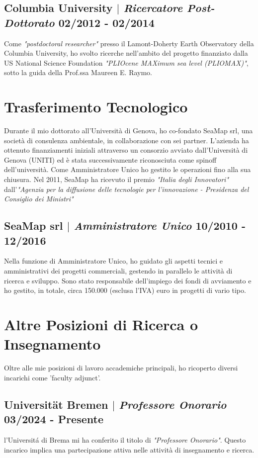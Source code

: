 \documentclass[11pt]{article}
\begin{document}
\subsection{Columbia University $|$ {\normalfont\textit{Ricercatore Post-Dottorato}} \hfill 02/2012 - 02/2014}
{\footnotesize Come \textit{"postdoctoral researcher"} presso il Lamont-Doherty Earth Observatory della Columbia University, ho svolto ricerche nell'ambito del progetto finanziato dalla US National Science Foundation \textit{"PLIOcene MAXimum sea level (PLIOMAX)"}, sotto la guida della Prof.ssa Maureen E. Raymo.}

\section{Trasferimento Tecnologico}
{\normalfont Durante il mio dottorato all'Università di Genova, ho co-fondato SeaMap srl, una società di consulenza ambientale, in collaborazione con sei partner. L'azienda ha ottenuto finanziamenti iniziali attraverso un consorzio avviato dall'Università di Genova (UNITI) ed è stata successivamente riconosciuta come spinoff dell'università. Come Amministratore Unico ho gestito le operazioni fino alla sua chiusura. Nel 2011, SeaMap ha ricevuto il premio \textit{"Italia degli Innovatori"} dall'\textit{"Agenzia per la diffusione delle tecnologie per l’innovazione - Presidenza del Consiglio dei Ministri"}}\\
\bigskip

\subsection{SeaMap srl $|$ {\normalfont\textit{Amministratore Unico}} \hfill 10/2010 - 12/2016}
{\footnotesize Nella funzione di Amministratore Unico, ho guidato gli aspetti tecnici e amministrativi dei progetti commerciali, gestendo in parallelo le attività di ricerca e sviluppo. Sono stato responsabile dell'impiego dei fondi di avviamento e ho gestito, in totale, circa 150.000 (esclusa l'IVA) euro in progetti di vario tipo.}
\bigskip

\section{Altre Posizioni di Ricerca o Insegnamento}
{\normalfont Oltre alle mie posizioni di lavoro accademiche principali, ho ricoperto diversi incarichi come 'faculty adjunct'.}\\
\bigskip

\subsection{Universität Bremen $|$ {\normalfont\textit{Professore Onorario}} \hfill 03/2024 - Presente}
{\footnotesize l'Universitá di Brema mi ha conferito il titolo di \textit{"Professore Onorario"}. Questo incarico implica una partecipazione attiva nelle attività di insegnamento e ricerca.}
\bigskip
\end{document}
